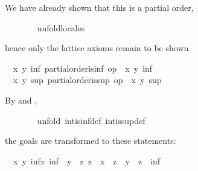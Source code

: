 \begin{isabellebody}
\begin{isamarkuptxt}%
\normalsize We have already shown that this is a partial
	order,%
\end{isamarkuptxt}%
\isamarkuptrue%
\ \ \ \ \ \ \isamarkupfalse%
\ unfold{}locales%
\begin{isamarkuptxt}%
\normalsize hence only the lattice axioms remain to be
	shown.
        \begin{isabelle}%
\ {}{}\ {}x\ y{}\ {}inf{}\ partial{}order{}is{}inf\ op\ {}\ x\ y\ inf\isanewline
\ {}{}\ {}x\ y{}\ {}sup{}\ partial{}order{}is{}sup\ op\ {}\ x\ y\ sup%
\end{isabelle}
	By  and ,%
\end{isamarkuptxt}%
\isamarkuptrue%
\ \ \ \ \ \ \isamarkupfalse%
\ {}unfold\ int{}is{}inf{}def\ int{}is{}sup{}def{}%
\begin{isamarkuptxt}%
\normalsize the goals are transformed to these
	statements:
	\begin{isabelle}%
\ {}{}\ {}x\ y{}\ {}inf{}x{}\ inf\ {}\ y\ {}\ {}{}z{}\ z\ {}\ x\ {}\ z\ {}\ y\ {}\ z\ {}\ inf{}\isanewline

\end{isabelle}
\end{isamarkuptxt}
\end{isabellebody}
